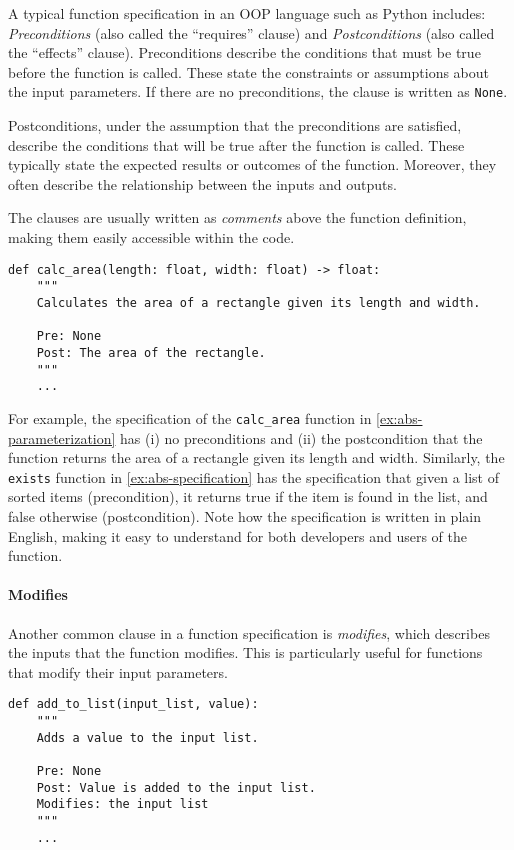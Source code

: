 \documentclass[oneside,11pt,dvipsnames]{book}
\newcommand{\code}[1]{\texttt{#1}}
\begin{document}
A typical function specification in an OOP language such as Python includes: \emph{Preconditions} (also called the ``requires'' clause) and \emph{Postconditions} (also called the ``effects'' clause). Preconditions describe the conditions that must be true before the function is called. These state the constraints or assumptions about the input parameters. If there are no preconditions, the clause is written as \code{None}.

Postconditions, under the assumption that the preconditions are satisfied, describe the conditions that will be true after the function is called. These typically state the expected results or outcomes of the function. Moreover, they often describe the relationship between the inputs and outputs.


The clauses are usually written as \emph{comments} above the function definition, making them easily accessible within the code.


\begin{lstlisting}
def calc_area(length: float, width: float) -> float:
    """
    Calculates the area of a rectangle given its length and width.

    Pre: None
    Post: The area of the rectangle.
    """
    ...
\end{lstlisting}

For example, the specification of the \code{calc\_area} function in \autoref{ex:abs-parameterization} has (i) no preconditions and (ii) the postcondition that the function returns the area of a rectangle given its length and width.  Similarly, the \code{exists} function in \autoref{ex:abs-specification} has the specification that given a list of sorted items (precondition), it returns true if the item is found in the list, and false otherwise (postcondition).  Note how the specification is written in plain English, making it easy to understand for both developers and users of the function.


\paragraph{Modifies} Another common clause in a function specification is \emph{modifies}, which describes the inputs that the function modifies. This is particularly useful for functions that modify their input parameters.

\begin{lstlisting}
def add_to_list(input_list, value):
    """
    Adds a value to the input list.

    Pre: None
    Post: Value is added to the input list.
    Modifies: the input list
    """
    ...
\end{lstlisting}
\end{document}
